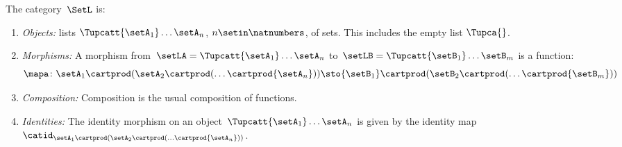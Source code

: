 %

\begin{definition}
    \label{def:SetL}
    The category~$\SetL$ is:
    \begin{enumerate}
        \item \emph{Objects:} lists $\Tupcatt {\setA_1}  \dots {\setA_n}$, $n \setin \natnumbers$, of sets.
              This includes the empty list $\Tupca {}$.
        \item \emph{Morphisms:}
              A morphism from~$\setLA =\Tupcatt {\setA_1}  \dots {\setA_n}$ to~$\setLB = \Tupcatt {\setB_1} \dots {\setB_m}$ is a function:
              \begin{equation*}
                  \mapa\colon {\setA_1} \cartprod (\setA_2 \cartprod (\ldots \cartprod {\setA_n})) \sto {\setB_1} \cartprod (\setB_2 \cartprod (\ldots \cartprod {\setB_m}))
              \end{equation*}
        \item \emph{Composition:}
              Composition is the usual composition of functions.
        \item \emph{Identities:}
              The identity morphism on an object~$\Tupcatt {\setA_1} \dots {\setA_n}$ is given by the identity map~$\catid_{{\setA_1} \cartprod (\setA_2 \cartprod (\ldots \cartprod {\setA_n}))}$.
    \end{enumerate}
\end{definition}

